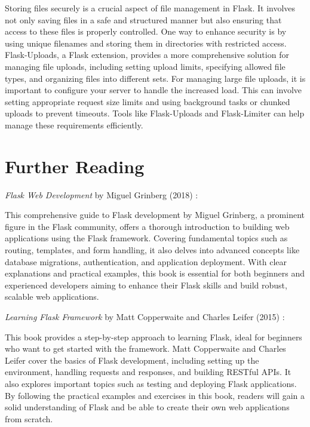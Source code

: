 Storing files securely is a crucial aspect of file management in Flask. It involves not only saving files in a safe and structured manner but also ensuring that access to these files is properly controlled. One way to enhance security is by using unique filenames and storing them in directories with restricted access. Flask-Uploads, a Flask extension, provides a more comprehensive solution for managing file uploads, including setting upload limits, specifying allowed file types, and organizing files into different sets. For managing large file uploads, it is important to configure your server to handle the increased load. This can involve setting appropriate request size limits and using background tasks or chunked uploads to prevent timeouts. Tools like Flask-Uploads and Flask-Limiter can help manage these requirements efficiently.\cite{Flaskdocs:2024}


\section{Further Reading}

\textit{Flask Web Development} by Miguel Grinberg (2018) \cite{Grinberg:2018}:

This comprehensive guide to Flask development by Miguel Grinberg, a prominent figure in the Flask community, offers a thorough introduction to building web applications using the Flask framework. Covering fundamental topics such as routing, templates, and form handling, it also delves into advanced concepts like database migrations, authentication, and application deployment. With clear explanations and practical examples, this book is essential for both beginners and experienced developers aiming to enhance their Flask skills and build robust, scalable web applications.

\textit{Learning Flask Framework} by Matt Copperwaite and Charles Leifer (2015) \cite{copperwaitelearning:2015}:

This book provides a step-by-step approach to learning Flask, ideal for beginners who want to get started with the framework. Matt Copperwaite and Charles Leifer cover the basics of Flask development, including setting up the environment, handling requests and responses, and building RESTful APIs. It also explores important topics such as testing and deploying Flask applications. By following the practical examples and exercises in this book, readers will gain a solid understanding of Flask and be able to create their own web applications from scratch.

